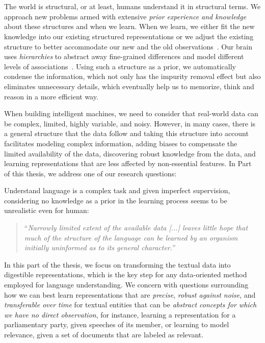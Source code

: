 \part{}
\label{part1}
%
The world is structural, or at least, humans understand it in structural terms. We approach new problems armed with extensive \emph{prior experience and knowledge} about these structures and when we learn. 
When we learn, we either fit the new knowledge into our existing structured representations or we adjust the existing structure to better accommodate our new and the old observations~\citep{battaglia2018relational}.
%
Our brain uses \emph{hierarchies} to abstract away fine-grained differences and model different levels of associations~\citep{Ballard:2015}. Using such a structure as a prior, we automatically condense the information, which not only has the impurity removal effect but also eliminates unnecessary details, which eventually help us to memorize, think and reason in a more efficient way.

When building intelligent machines, we need to consider that real-world data can be complex, limited, highly variable, and noisy. However, in many cases, there is a general structure that the data follow and taking this structure into account facilitates modeling complex information, adding biases to compensate the limited availability of the data, discovering robust knowledge from the data, and learning representations that are less affected by non-essential features. 
%
In Part~\ref{part1} of this thesis, we address one of our research questions:

Understand language is a complex task and given imperfect supervision, considering no knowledge as a prior in the learning process seems to be unrealistic even for human: 
\begin{quote}
    ``\emph{Narrowly limited extent of the available data [...] leaves little hope that much of the structure of the language can be learned by an organism initially uninformed as to its general character.}''~\citet{chomsky1965}
\end{quote}

In this part of the thesis, we focus on transforming the textual data into digestible representations, which is the key step for any data-oriented method~\citep{Bengio:2013} employed for language understanding. 
We concern with questions surrounding how we can best learn representations that are \emph{precise}, \emph{robust against noise}, and \emph{transferable over time} for textual entities that can be \emph{abstract concepts for which we have no direct observation}, for instance, learning a representation for a parliamentary party, given speeches of its member, or learning to model relevance, given a set of documents that are labeled as relevant.


